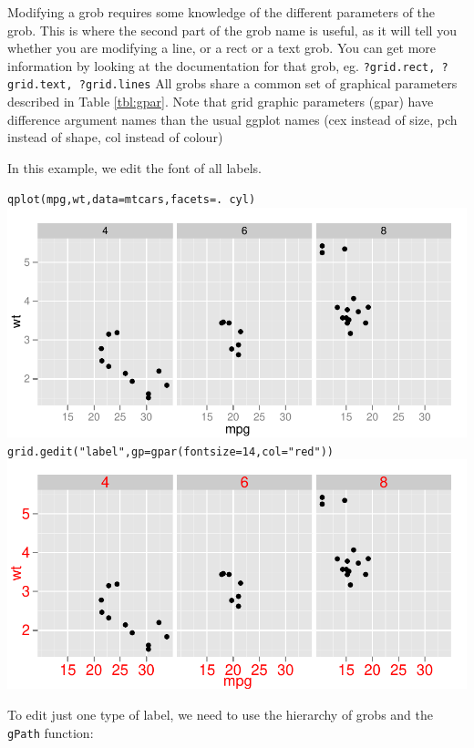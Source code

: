 Modifying a grob requires some knowledge of the different parameters of the grob.  This is where the second part of the grob name is useful, as it will tell you whether you are modifying a line, or a rect or a text grob.  You can get more information by looking at the documentation for that grob, eg. {\tt ?grid.rect, ?grid.text, ?grid.lines}   All grobs share a common set of graphical parameters described in Table \ref{tbl:gpar}.  Note that grid graphic parameters (gpar) have difference argument names than the usual ggplot names (cex instead of size, pch instead of shape, col instead of colour)

In this example, we edit the font of all labels.

\begin{alltt}
qplot(mpg, wt, data=mtcars, facets = . ~ cyl)
\includegraphics[scale=0.5]{grid1}
grid.gedit("label", gp=gpar(fontsize=14, col="red"))
\includegraphics[scale=0.5]{grid2}
\end{alltt}

To edit just one type of label, we need to use the hierarchy of grobs and the {\tt gPath} function:

